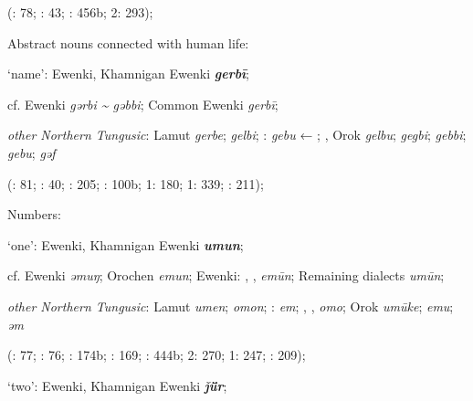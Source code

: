 \documentclass[output=paper,colorlinks,citecolor=brown]{langscibook}
\begin{document}
\begin{xlist}
\begin{xlist}
    (\citealt{Castrén1856}: 78; \citealt{Janhunen1991}: 43; \citealt{Vasilevic1958}: 456b; \citealt{Cincius1975B} 2: 293);

\end{xlist}

    \ex Abstract nouns connected with human life:

\begin{xlist}
    \ex ‘name’:  Ewenki, Khamnigan Ewenki \textbf{\textit{gerbī}};

    cf.  Ewenki \textit{gǝrbi {\textasciitilde} gǝbbi};  Common Ewenki \textit{gerbī};

    \textit{other Northern Tungusic}: Lamut \textit{gerbe};  \textit{gelbi}; \textit{}:  \textit{gebu} ← ; , Orok \textit{gelbu};  \textit{gegbi};  \textit{gebbi};  \textit{gebu};  \textit{gǝf} 
    
    (\citealt{Castrén1856}: 81; \citealt{Janhunen1991}: 40; \citealt{Dorji1998}: 205; \citealt{Vasilevic1958}: 100b; \citealt{Cincius1975B} 1: 180; \citealt{Hauer1952} 1: 339; \citealt{Zikmundová2013a}: 211);

\end{xlist}

    \ex Numbers:

\begin{xlist}
    \ex ‘one’:  Ewenki, Khamnigan Ewenki \textbf{\textit{umun}};

    cf.  Ewenki \textit{ǝmuŋ}; Orochen \textit{emun};  Ewenki: , ,  \textit{emūn}; Remaining dialects \textit{umūn};

    \textit{other Northern Tungusic}: Lamut \textit{umen};  \textit{omon}; \textit{}:  \textit{em}; , ,  \textit{omo}; Orok \textit{umūke};  \textit{emu};  \textit{ǝm}
    
    (\citealt{Castrén1856}: 77; \citealt{Janhunen1991}: 76; \citealt{Dorji1998}: 174b; \citealt{Chaoke2014a}: 169; \citealt{Vasilevic1958}: 444b; \citealt{Cincius1975B} 2: 270; \citealt{Hauer1952} 1: 247; \citealt{Zikmundová2013a}: 209);

    \ex ‘two’:  Ewenki, Khamnigan Ewenki \textbf{\textit{ǰǖr}};


\end{xlist}
\end{xlist}
\end{document}
